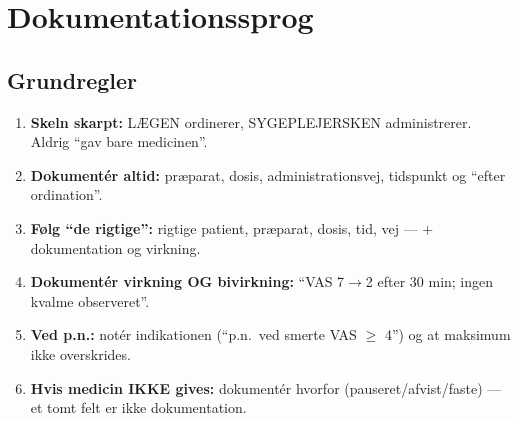 \documentclass[11pt,a4paper]{report}
\begin{document}
\section{Dokumentationssprog}
\subsection{Grundregler}
\begin{enumerate}[leftmargin=1.4em,itemsep=4pt]
\item \textbf{Skeln skarpt:} LÆGEN ordinerer, SYGEPLEJERSKEN administrerer. Aldrig ``gav bare medicinen''.
\item \textbf{Dokumentér altid:} præparat, dosis, administrationsvej, tidspunkt og ``efter ordination''.
\item \textbf{Følg ``de rigtige'':} rigtige patient, præparat, dosis, tid, vej --- + dokumentation og virkning.
\item \textbf{Dokumentér virkning OG bivirkning:} ``VAS 7$\rightarrow$2 efter 30 min; ingen kvalme observeret''.
\item \textbf{Ved p.n.:} notér indikationen (``p.n.\ ved smerte VAS $\geq$ 4'') og at maksimum ikke overskrides.
\item \textbf{Hvis medicin IKKE gives:} dokumentér hvorfor (pauseret/afvist/faste) --- et tomt felt er ikke dokumentation.
\end{enumerate}
\end{document}
